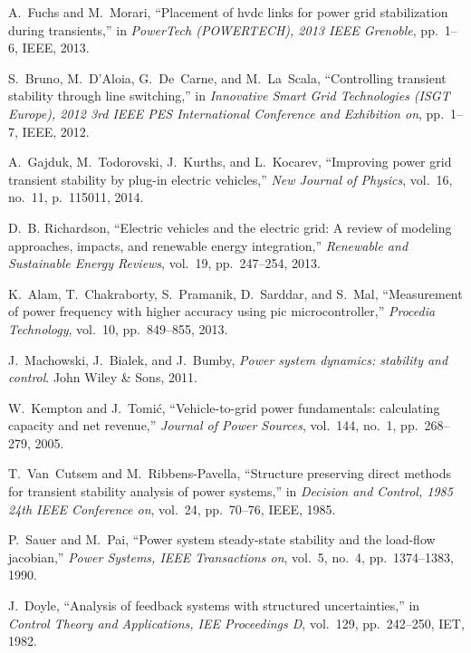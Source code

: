 \documentclass[final,12pt]{elsarticle}
\begin{document}
\begin{thebibliography}{10}
A.~Fuchs and M.~Morari, ``Placement of hvdc links for power grid stabilization
  during transients,'' in {\em PowerTech (POWERTECH), 2013 IEEE Grenoble},
  pp.~1--6, IEEE, 2013.

S.~Bruno, M.~D'Aloia, G.~De~Carne, and M.~La~Scala, ``Controlling transient
  stability through line switching,'' in {\em Innovative Smart Grid
  Technologies (ISGT Europe), 2012 3rd IEEE PES International Conference and
  Exhibition on}, pp.~1--7, IEEE, 2012.

A.~Gajduk, M.~Todorovski, J.~Kurths, and L.~Kocarev, ``Improving power grid
  transient stability by plug-in electric vehicles,'' {\em New Journal of
  Physics}, vol.~16, no.~11, p.~115011, 2014.

D.~B. Richardson, ``Electric vehicles and the electric grid: A review of
  modeling approaches, impacts, and renewable energy integration,'' {\em
  Renewable and Sustainable Energy Reviews}, vol.~19, pp.~247--254, 2013.

K.~Alam, T.~Chakraborty, S.~Pramanik, D.~Sarddar, and S.~Mal, ``Measurement of
  power frequency with higher accuracy using pic microcontroller,'' {\em
  Procedia Technology}, vol.~10, pp.~849--855, 2013.

J.~Machowski, J.~Bialek, and J.~Bumby, {\em Power system dynamics: stability
  and control}.
\newblock John Wiley \& Sons, 2011.

W.~Kempton and J.~Tomi{\'c}, ``Vehicle-to-grid power fundamentals: calculating
  capacity and net revenue,'' {\em Journal of Power Sources}, vol.~144, no.~1,
  pp.~268--279, 2005.

T.~Van~Cutsem and M.~Ribbens-Pavella, ``Structure preserving direct methods for
  transient stability analysis of power systems,'' in {\em Decision and
  Control, 1985 24th IEEE Conference on}, vol.~24, pp.~70--76, IEEE, 1985.

P.~Sauer and M.~Pai, ``Power system steady-state stability and the load-flow
  jacobian,'' {\em Power Systems, IEEE Transactions on}, vol.~5, no.~4,
  pp.~1374--1383, 1990.

J.~Doyle, ``Analysis of feedback systems with structured uncertainties,'' in
  {\em Control Theory and Applications, IEE Proceedings D}, vol.~129,
  pp.~242--250, IET, 1982.


\end{thebibliography}
\end{document}
